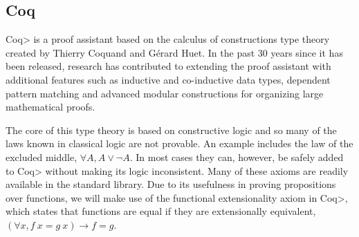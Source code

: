 \subsection{Coq}
\<Coq> is a proof assistant based on the calculus of constructions type theory created by Thierry Coquand and G\'{e}rard Huet\cite{Coquand1988}.
In the past 30 years since it has been released, research has contributed to extending the proof assistant with additional features such as inductive and co-inductive data types\cite{Coquand1990}, dependent pattern matching\cite{Sozeau2010} and advanced modular constructions for organizing large mathematical proofs\cite{Sozeau2008}\cite{Mahboubi2013}.

The core of this type theory is based on constructive logic and so many of the laws known in classical logic are not provable.
An example includes the law of the excluded middle, $\forall A, A \vee \neg A$.
In most cases they can, however, be safely added to \<Coq> without making its logic inconsistent. Many of these axioms are readily available in the standard library.
Due to its usefulness in proving propositions over functions, we will make use of the functional extensionality axiom in \<Coq>, which states that functions are equal if they are extensionally equivalent, $(\forall x, f\ x = g\ x) \to f = g$.




